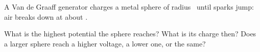 A Van de Graaff generator charges a metal sphere of radius \RsO\ until sparks jump: air breaks down at about \EbO.

\begin{abcliste}
\abc What is the highest potential the sphere reaches?
\abc What is its charge then?
\abc Does a larger sphere reach a higher voltage, a lower one, or the same?
\end{abcliste}
